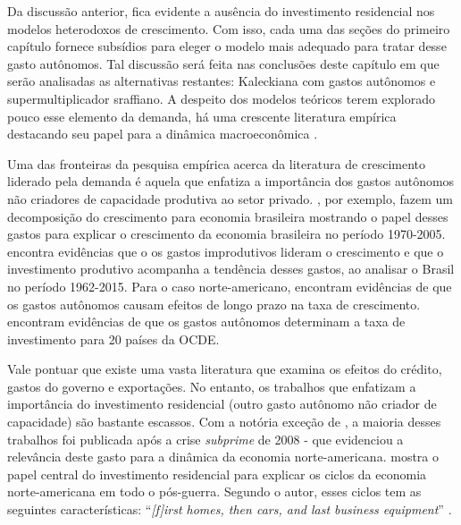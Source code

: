 Da discussão anterior, fica evidente a ausência do investimento residencial nos modelos heterodoxos de crescimento.
Com isso, cada uma das seções do primeiro capítulo fornece subsídios para eleger o modelo mais adequado para tratar desse gasto autônomos. Tal discussão será feita nas conclusões deste capítulo em que serão analisadas as alternativas restantes: Kaleckiana com gastos autônomos e supermultiplicador sraffiano. A despeito dos modelos teóricos terem explorado pouco esse elemento da demanda, há uma crescente literatura empírica destacando seu papel para a dinâmica macroeconômica \cites{leamer_housing_2007}{jorda_great_2014}{fiebiger_semi-autonomous_2018}{fiebiger_trend_2017}. 


Uma das fronteiras da pesquisa empírica acerca da literatura de crescimento liderado pela demanda é aquela que enfatiza a importância dos gastos autônomos não criadores de capacidade produtiva ao setor privado. \textcite{freitas_pattern_2013}, por exemplo, fazem um decomposição do crescimento para economia brasileira mostrando o papel desses gastos para explicar o crescimento da economia brasileira no período 1970-2005. \textcite{braga_investment_2018} encontra evidências que o os gastos improdutivos lideram o crescimento e que o investimento produtivo acompanha a tendência desses gastos, ao analisar o Brasil no período 1962-2015. Para o caso norte-americano, \textcite{girardi_long-run_2016} encontram evidências de que os gastos autônomos causam efeitos de longo prazo na taxa de crescimento. \textcite{girardi_autonomous_2018} encontram evidências de que os gastos autônomos determinam a taxa de investimento para 20 países da OCDE. 

Vale pontuar que existe uma vasta literatura que examina os efeitos do crédito, gastos do governo e exportações. No entanto,  os trabalhos que enfatizam a importância do investimento residencial (outro gasto autônomo não criador de capacidade) são bastante escassos. Com a notória exceção de \textcite{leamer_housing_2007}, a maioria desses trabalhos foi publicada após a crise \textit{subprime} de 2008 - que evidenciou a relevância deste gasto para a dinâmica da economia norte-americana. \textcite[p.~2]{leamer_housing_2007} mostra o papel central do investimento residencial para explicar os ciclos da economia norte-americana em todo o pós-guerra. Segundo o autor, esses ciclos tem as seguintes características: ``\textit{[f]irst homes, then cars, and last business equipment}'' \cite[p.~8]{leamer_housing_2007}. 
 
